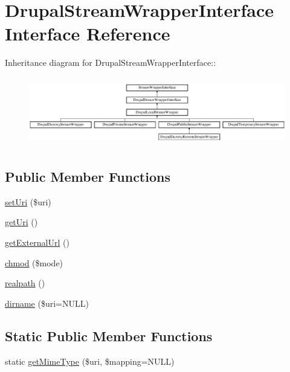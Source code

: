 \hypertarget{interfaceDrupalStreamWrapperInterface}{
\section{DrupalStreamWrapperInterface Interface Reference}
\label{interfaceDrupalStreamWrapperInterface}
}
Inheritance diagram for DrupalStreamWrapperInterface::\begin{figure}[H]
\begin{center}
\leavevmode
\includegraphics[height=3.07018cm]{interfaceDrupalStreamWrapperInterface}
\end{center}
\end{figure}
\subsection*{Public Member Functions}
\begin{DoxyCompactItemize}
\item 
\hyperlink{interfaceDrupalStreamWrapperInterface_aa04b517df51d24252e656d67515224f6}{setUri} (\$uri)
\item 
\hyperlink{interfaceDrupalStreamWrapperInterface_aeedd16f8876b4b3a0cad73a2759db6ca}{getUri} ()
\item 
\hyperlink{interfaceDrupalStreamWrapperInterface_af8474357b8c79f1a7629084a05541d16}{getExternalUrl} ()
\item 
\hyperlink{interfaceDrupalStreamWrapperInterface_a1b1e5436bc2d310b1d340f389f7484b3}{chmod} (\$mode)
\item 
\hyperlink{interfaceDrupalStreamWrapperInterface_adb16cd1ac42f9d7a273546f5cbf0d9d3}{realpath} ()
\item 
\hyperlink{interfaceDrupalStreamWrapperInterface_a4d189eb40075b3873752c7706e41aac6}{dirname} (\$uri=NULL)
\end{DoxyCompactItemize}
\subsection*{Static Public Member Functions}
\begin{DoxyCompactItemize}
\item 
static \hyperlink{interfaceDrupalStreamWrapperInterface_a7c239b7827b124425e655deb257d34b7}{getMimeType} (\$uri, \$mapping=NULL)
\end{DoxyCompactItemize}


